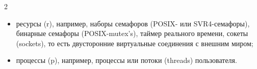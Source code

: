 \begin{multicols}{2}
\begin{itemize}

\item ресурсы (r), например, наборы семафоров (POSIX- или SVR4-семафоры), бинарные семафоры (POSIX-mutex's), таймер реального времени, сокеты (sockets), то есть двусторонние виртуальные соединения с внешним миром;

\item процессы (p), например, процессы или потоки (threads) пользователя.

\end{itemize}



\end{multicols}



\label{end\stat}

